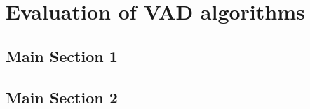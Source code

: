 
\chapter{Evaluation of VAD algorithms} %

\label{Chapter4} %



\section{Main Section 1}


\section{Main Section 2}


